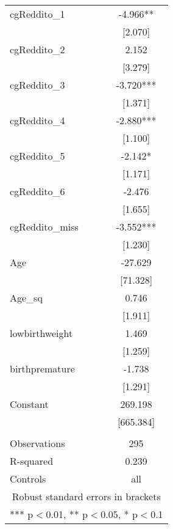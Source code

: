 \documentclass[]{article}
\begin{document}
\begin{tabular}{lc}
cgReddito\_1 & -4.966** \\
 & [2.070] \\
cgReddito\_2 & 2.152 \\
 & [3.279] \\
cgReddito\_3 & -3.720*** \\
 & [1.371] \\
cgReddito\_4 & -2.880*** \\
 & [1.100] \\
cgReddito\_5 & -2.142* \\
 & [1.171] \\
cgReddito\_6 & -2.476 \\
 & [1.655] \\
cgReddito\_miss & -3.552*** \\
 & [1.230] \\
Age & -27.629 \\
 & [71.328] \\
Age\_sq & 0.746 \\
 & [1.911] \\
lowbirthweight & 1.469 \\
 & [1.259] \\
birthpremature & -1.738 \\
 & [1.291] \\
Constant & 269.198 \\
 & [665.384] \\
 &  \\
Observations & 295 \\
R-squared & 0.239 \\
 Controls & all \\ \hline
\multicolumn{2}{c}{ Robust standard errors in brackets} \\
\multicolumn{2}{c}{ *** p$<$0.01, ** p$<$0.05, * p$<$0.1} \\
\end{tabular}
\end{document}

